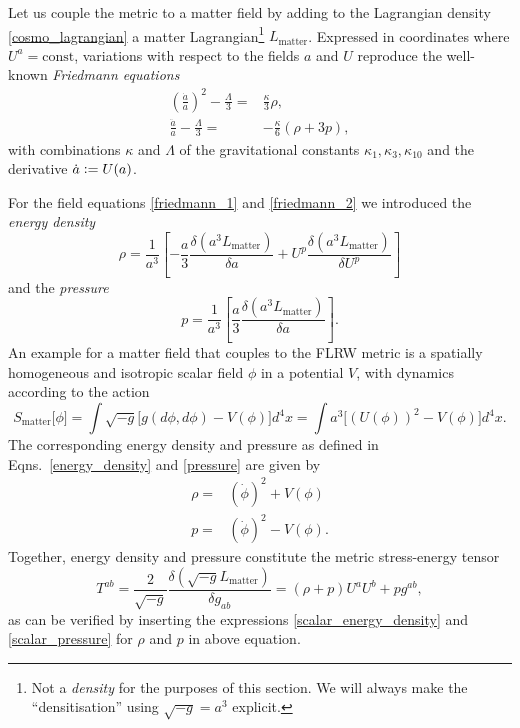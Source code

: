 Let us couple the metric to a matter field by adding to the Lagrangian density \eqref{cosmo_lagrangian} a matter Lagrangian\footnote{Not a \emph{density} for the purposes of this section. We will always make the ``densitisation'' using $\sqrt{-g} = a^3$ explicit.} $L_\text{matter}$. Expressed in coordinates where $U^a = \text{const}$, variations with respect to the fields $a$ and $U$ reproduce the well-known \emph{Friedmann equations} \cite{Friedman_1922}
\begin{align}
  \left(\frac{\dot a}{a}\right)^2 - \frac{\Lambda}{3} = {} & \frac{\kappa}{3} \rho, \label{friedmann_1}\\
  \frac{\ddot a}{a} - \frac{\Lambda}{3} = {} & -\frac{\kappa}{6}(\rho + 3 p), \label{friedmann_2}
\end{align}
with combinations $\kappa$ and $\Lambda$ of the gravitational constants $\kappa_1,\kappa_3,\kappa_{10}$ and the derivative $\dot a \vcentcolon= U(a)$.

For the field equations \eqref{friedmann_1} and \eqref{friedmann_2} we introduced the \emph{energy density}
\begin{equation}\label{energy_density}
  \rho = \frac{1}{a^3}\left\lbrack -\frac{a}{3} \frac{\delta(a^3 L_\text{matter})}{\delta a} + U^p \frac{\delta(a^3L_\text{matter})}{\delta U^p}\right\rbrack
\end{equation}
and the \emph{pressure}
\begin{equation}\label{pressure}
  p = \frac{1}{a^3} \left\lbrack \frac{a}{3} \frac{\delta(a^3L_\text{matter})}{\delta a}\right\rbrack.
\end{equation}
An example for a matter field that couples to the FLRW metric is a spatially homogeneous and isotropic scalar field $\phi$ in a potential $V$, with dynamics according to the action
\begin{equation}
  S_\text{matter}\lbrack\phi\rbrack = \int \sqrt{-g}\lbrack g(d\phi,d\phi) - V(\phi)\rbrack d^4x = \int a^3\lbrack (U(\phi))^2 - V(\phi)\rbrack d^4x.
\end{equation}
The corresponding energy density and pressure as defined in Eqns.~\eqref{energy_density} and \eqref{pressure} are given by
\begin{align}
  \rho = {} & (\dot\phi)^2 + V(\phi) \label{scalar_energy_density}\\
  p = {} & (\dot\phi)^2 - V(\phi) \label{scalar_pressure}.
\end{align}
Together, energy density and pressure constitute the metric stress-energy tensor
\begin{equation}
  T^{ab} = \frac{2}{\sqrt{-g}}\frac{\delta(\sqrt{-g}L_\text{matter})}{\delta g_{ab}} = (\rho + p)U^aU^b + pg^{ab},
\end{equation}
as can be verified by inserting the expressions \eqref{scalar_energy_density} and \eqref{scalar_pressure} for $\rho$ and $p$ in above equation.

